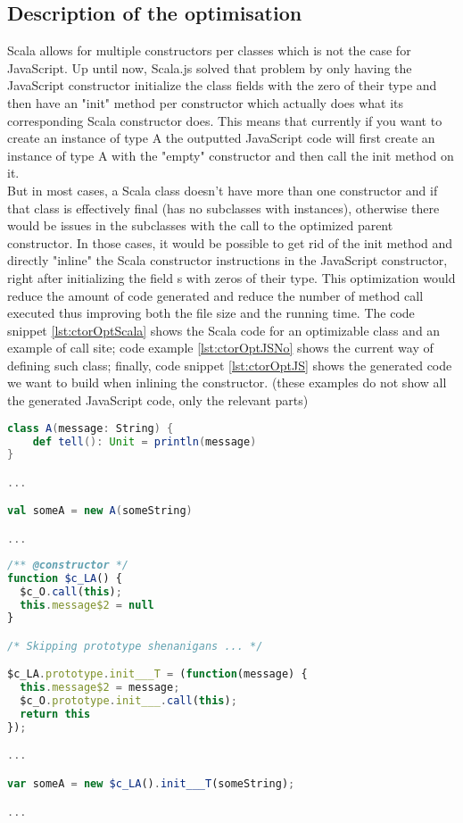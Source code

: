\subsection{Description of the optimisation}
Scala allows for multiple constructors per classes which is not the case for
JavaScript. Up until now, Scala.js solved that problem by only having the
JavaScript constructor initialize the class fields with the zero of their type
and then have an "init" method per constructor which actually does what its
corresponding Scala constructor does. This means that currently if you want to
create an instance of type A the outputted JavaScript code will first create an
instance of type A with the "empty" constructor and then call the init method
on it. \\
But in most cases, a Scala class doesn't have more than one constructor and if
that class is effectively final (has no subclasses with instances), otherwise
there would be issues in the subclasses with the call to the optimized parent
constructor. In those cases, it would be possible to get rid of the init method
and directly "inline" the Scala constructor instructions in the JavaScript
constructor, right after initializing the field s with zeros of their type.
This optimization would reduce the amount of code generated and reduce the
number of method call executed thus improving both the file size and the
running time. The code snippet \ref{lst:ctorOptScala} shows the Scala code for
an optimizable class and an example of call site; code example
\ref{lst:ctorOptJSNo} shows the current way of defining such class; finally,
code snippet \ref{lst:ctorOptJS} shows the generated code we want to build when
inlining the constructor. (these examples do not show all the generated
JavaScript code, only the relevant parts)

\begin{lstlisting}[language=scala,caption=Example Scala Code.,
label={lst:ctorOptScala}]
class A(message: String) {
    def tell(): Unit = println(message)
}

...

val someA = new A(someString)

...

\end{lstlisting}
\begin{lstlisting}[language=javascript,caption=Generated JavaScript without
optimisation., label={lst:ctorOptJSNo}]
/** @constructor */
function $c_LA() {
  $c_O.call(this);
  this.message$2 = null
}

/* Skipping prototype shenanigans ... */

$c_LA.prototype.init___T = (function(message) {
  this.message$2 = message;
  $c_O.prototype.init___.call(this);
  return this
});

...

var someA = new $c_LA().init___T(someString);

...

\end{lstlisting}

